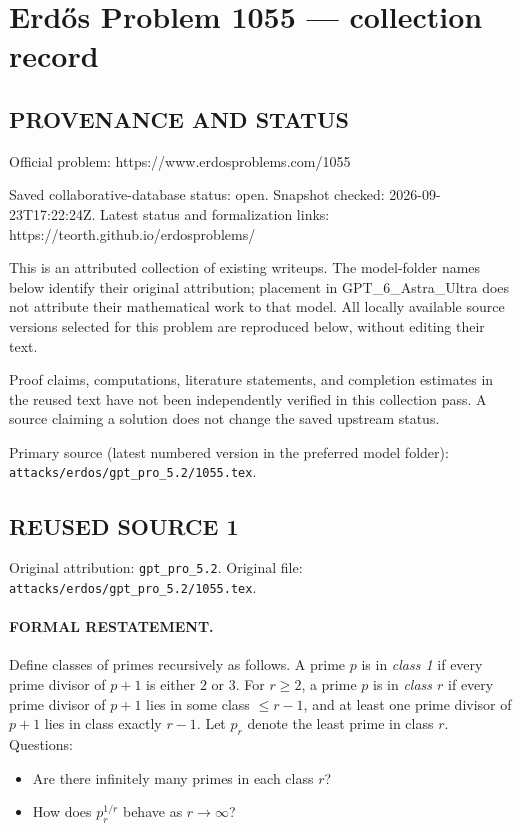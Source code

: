 \section*{Erd\H{o}s Problem 1055 --- collection record}

\subsection*{PROVENANCE AND STATUS}
Official problem: https://www.erdosproblems.com/1055

Saved collaborative-database status: open.
Snapshot checked: 2026-09-23T17:22:24Z.
Latest status and formalization links: https://teorth.github.io/erdosproblems/

This is an attributed collection of existing writeups. The model-folder names below identify their original attribution; placement in GPT\_6\_Astra\_Ultra does not attribute their mathematical work to that model. All locally available source versions selected for this problem are reproduced below, without editing their text.

Proof claims, computations, literature statements, and completion estimates in the reused text have not been independently verified in this collection pass. A source claiming a solution does not change the saved upstream status.

Primary source (latest numbered version in the preferred model folder): \texttt{attacks/erdos/gpt\_pro\_5.2/1055.tex}.

\subsection*{REUSED SOURCE 1}
Original attribution: \texttt{gpt\_pro\_5.2}.
Original file: \texttt{attacks/erdos/gpt\_pro\_5.2/1055.tex}.


\paragraph{FORMAL RESTATEMENT.}
Define classes of primes recursively as follows.
A prime $p$ is in \emph{class 1} if every prime divisor of $p+1$ is either $2$ or $3$.
For $r\ge 2$, a prime $p$ is in \emph{class $r$} if every prime divisor of $p+1$ lies in some class $\le r-1$, and at least one prime divisor of $p+1$ lies in class exactly $r-1$.
Let $p_r$ denote the least prime in class $r$.
Questions:
\begin{itemize}
\item Are there infinitely many primes in each class $r$?
\item How does $p_r^{1/r}$ behave as $r\to\infty$?
\end{itemize}

